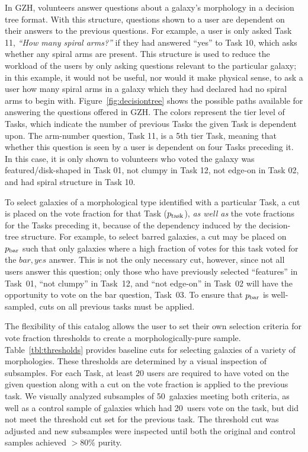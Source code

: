 \documentclass[twocolumn]{aastex6}
\begin{document}
In GZH, volunteers answer questions about a galaxy's morphology in a decision tree format. With this structure, questions shown to a user are dependent on their answers to the previous questions. For example, a user is only asked Task 11, {\it ``How many spiral arms?''} if they had answered ``yes'' to Task 10, which asks whether any spiral arms are present. This structure is used to reduce the workload of the users by only asking questions relevant to the particular galaxy; in this example, it would not be useful, nor would it make physical sense, to ask a user how many spiral arms in a galaxy which they had declared had no spiral arms to begin with. Figure~\ref{fig:decisiontree} shows the possible paths available for answering the questions offered in GZH. The colors represent the tier level of Tasks, which indicate the number of previous Tasks the given Task is dependent upon. The arm-number question, Task 11, is a 5th tier Task, meaning that whether this question is seen by a user is dependent on four Tasks preceding it. In this case, it is only shown to volunteers who voted the galaxy was featured/disk-shaped in Task 01, not clumpy in Task 12, not edge-on in Task 02, and had spiral structure in Task 10.  

To select galaxies of a morphological type identified with a particular Task, a cut is placed on the vote fraction for that Task ($p_{\rm task}$), \emph{as well as} the vote fractions for the Tasks preceding it, because of the dependency induced by the decision-tree structure. For example, to select barred galaxies, a cut may be placed on $p_{\rm bar}$ such that only galaxies where a high fraction of votes for this task voted for the $bar,yes$ answer. This is not the only necessary cut, however, since not all users answer this question; only those who have previously selected ``features'' in Task~01, ``not clumpy'' in Task~12, and ``not edge-on'' in Task~02 will have the opportunity to vote on the bar question, Task~03. To ensure that $p_{\rm bar}$ is well-sampled, cuts on all previous tasks must be applied. 

The flexibility of this catalog allows the user to set their own selection criteria for vote fraction thresholds to create a morphologically-pure sample. Table~\ref{tbl:thresholds} provides baseline cuts for selecting galaxies of a variety of morphologies. These thresholds are determined by a visual inspection of subsamples. For each Task, at least 20 users are required to have voted on the given question along with a cut on the vote fraction is applied to the previous task. We visually analyzed subsamples of 50~galaxies meeting both criteria, as well as a control sample of galaxies which had 20~users vote on the task, but did not meet the threshold cut set for the previous task. The threshold cut was adjusted and new subsamples were inspected until both the original and control samples achieved $>80\%$ purity.
\end{document}
